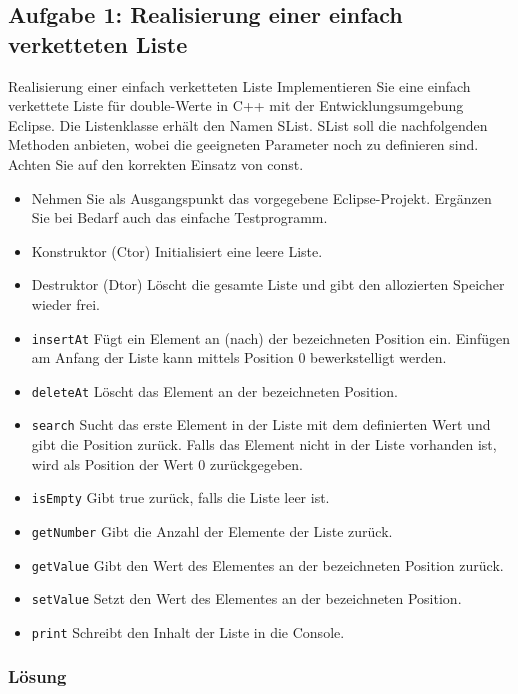 \subsection{Aufgabe 1: Realisierung einer einfach verketteten Liste}
Realisierung einer einfach verketteten Liste
Implementieren Sie eine einfach verkettete Liste für double-Werte in C++ mit der Entwicklungsumgebung
Eclipse. Die Listenklasse erhält den Namen SList.
SList soll die nachfolgenden Methoden anbieten, wobei die geeigneten Parameter noch zu definieren sind.
Achten Sie auf den korrekten Einsatz von const.
\begin{itemize}
\item Nehmen Sie als Ausgangspunkt das vorgegebene Eclipse-Projekt. Ergänzen Sie bei Bedarf auch das einfache
Testprogramm.
\item Konstruktor (Ctor) Initialisiert eine leere Liste.
\item Destruktor (Dtor) Löscht die gesamte Liste und gibt den allozierten Speicher wieder frei.
\item \texttt{insertAt} Fügt ein Element an (nach) der bezeichneten Position ein. Einfügen am Anfang der Liste kann mittels Position 0 bewerkstelligt werden.
\item\texttt{deleteAt}
Löscht das Element an der bezeichneten Position.
\item\texttt{search}
Sucht das erste Element in der Liste mit dem definierten Wert und gibt die Position zurück. Falls das Element
nicht in der Liste vorhanden ist, wird als Position der Wert 0 zurückgegeben.
\item\texttt{isEmpty}
Gibt true zurück, falls die Liste leer ist.
\item\texttt{getNumber}
Gibt die Anzahl der Elemente der Liste zurück.
\item\texttt{getValue}
Gibt den Wert des Elementes an der bezeichneten Position zurück.
\item\texttt{setValue}
Setzt den Wert des Elementes an der bezeichneten Position.
\item\texttt{print}
Schreibt den Inhalt der Liste in die Console.
\end{itemize}

\subsubsection{Lösung}


\noindent\makebox[\linewidth]{\rule{\paperwidth}{0.4pt}}

\noindent\makebox[\linewidth]{\rule{\paperwidth}{0.4pt}}


